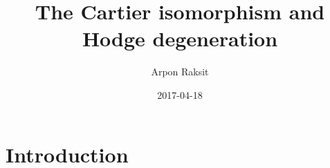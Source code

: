 


\title{The Cartier isomorphism and Hodge degeneration}
\author{Arpon Raksit}
\date{2017-04-18}



\maketitle

\newcommand{\an}{\mathrm{an}}
\newcommand{\chr}{\operatorname{char}}
\newcommand{\dR}{\mathrm{dR}}


\section{Introduction}
\label{intro}

